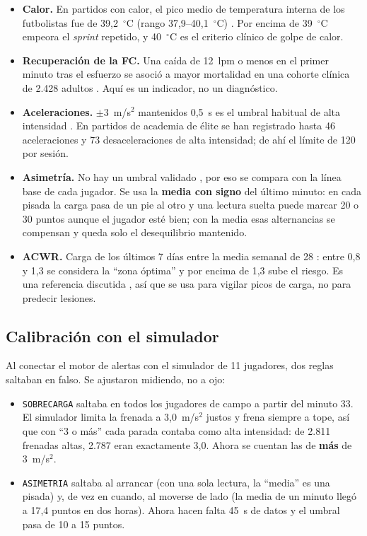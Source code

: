 \documentclass[runningheads]{llncs}
\begin{document}
\begin{itemize}
  \item \textbf{Calor.} En partidos con calor, el pico medio de temperatura interna de los futbolistas fue de 39,2~$^\circ$C (rango 37,9--40,1~$^\circ$C) \cite{tempfutbol,tempreview}. Por encima de 39~$^\circ$C empeora el \emph{sprint} repetido, y 40~$^\circ$C es el criterio clínico de golpe de calor.
  \item \textbf{Recuperación de la FC.} Una caída de 12~lpm o menos en el primer minuto tras el esfuerzo se asoció a mayor mortalidad en una cohorte clínica de 2.428 adultos \cite{cole1999}. Aquí es un indicador, no un diagnóstico.
  \item \textbf{Aceleraciones.} $\pm3$~m/s$^2$ mantenidos 0,5~s es el umbral habitual de alta intensidad \cite{statsports,scisports}. En partidos de academia de élite se han registrado hasta 46 aceleraciones y 73 desaceleraciones de alta intensidad; de ahí el límite de 120 por sesión.
  \item \textbf{Asimetría.} No hay un umbral validado \cite{plantillas}, por eso se compara con la línea base de cada jugador. Se usa la \textbf{media con signo} del último minuto: en cada pisada la carga pasa de un pie al otro y una lectura suelta puede marcar 20 o 30 puntos aunque el jugador esté bien; con la media esas alternancias se compensan y queda solo el desequilibrio mantenido.
  \item \textbf{ACWR.} Carga de los últimos 7 días entre la media semanal de 28 \cite{gabbett2016}: entre 0,8 y 1,3 se considera la ``zona óptima'' y por encima de 1,3 sube el riesgo. Es una referencia discutida \cite{impellizzeri2020}, así que se usa para vigilar picos de carga, no para predecir lesiones.
\end{itemize}

\subsection{Calibración con el simulador}

Al conectar el motor de alertas con el simulador de 11 jugadores, dos reglas saltaban en falso. Se ajustaron midiendo, no a ojo:

\begin{itemize}
  \item \texttt{SOBRECARGA} saltaba en todos los jugadores de campo a partir del minuto 33. El simulador limita la frenada a 3,0~m/s$^2$ justos y frena siempre a tope, así que con ``3 o más'' cada parada contaba como alta intensidad: de 2.811 frenadas altas, 2.787 eran exactamente 3,0. Ahora se cuentan las de \textbf{más} de 3~m/s$^2$.
  \item \texttt{ASIMETRIA} saltaba al arrancar (con una sola lectura, la ``media'' es una pisada) y, de vez en cuando, al moverse de lado (la media de un minuto llegó a 17,4 puntos en dos horas). Ahora hacen falta 45~s de datos y el umbral pasa de 10 a 15 puntos.
\end{itemize}
\end{document}
